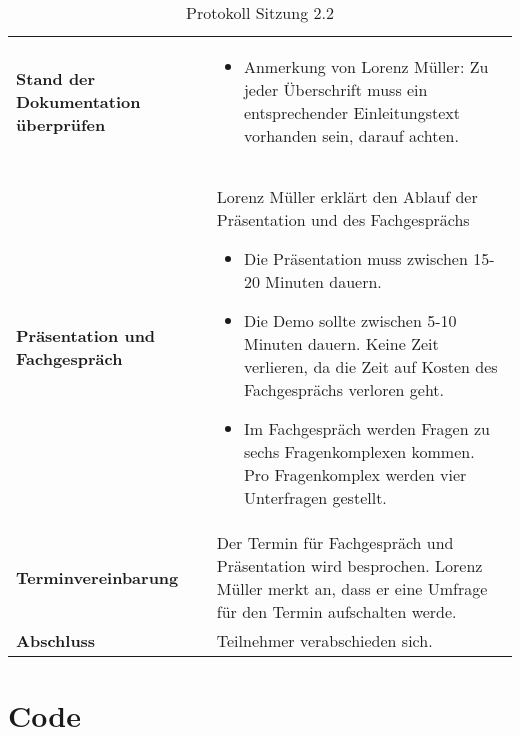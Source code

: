 \newpage

\begin{table}[H]
    \begin{tabular}{|L{0.3\textwidth}|L{0.7\textwidth}|}
        \hline
        \textbf{Stand der Dokumentation überprüfen} & 
        \begin{itemize}
            \item Anmerkung von Lorenz Müller: Zu jeder Überschrift muss ein entsprechender Einleitungstext vorhanden sein, darauf achten.
        \end{itemize} \\
        \textbf{Präsentation und Fachgespräch} & Lorenz Müller erklärt den Ablauf der Präsentation und des Fachgesprächs
        \begin{itemize}
            \item Die Präsentation muss zwischen 15-20 Minuten dauern.
            \item Die Demo sollte zwischen 5-10 Minuten dauern. Keine Zeit verlieren, da die Zeit auf Kosten des Fachgesprächs verloren geht.
            \item Im Fachgespräch werden Fragen zu sechs Fragenkomplexen kommen. Pro Fragenkomplex werden vier Unterfragen gestellt.
        \end{itemize}
        \\
        \hline
        \textbf{Terminvereinbarung} & Der Termin für Fachgespräch und Präsentation wird besprochen. Lorenz Müller merkt an, dass er eine Umfrage für den Termin aufschalten werde. \\
        \hline
        \textbf{Abschluss} & Teilnehmer verabschieden sich.   \\
        \hline
    \end{tabular}
    \caption{Protokoll Sitzung 2.2}
\end{table}

\newpage

\section{Code}

